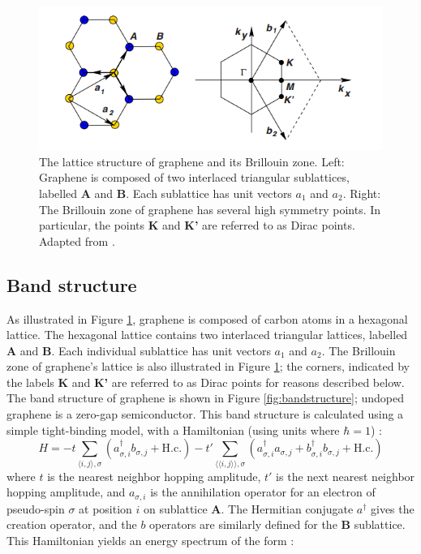 \documentclass[edeposit,fullpage,draftthesis]{uiucthesis2009}
\begin{document}
    \begin{figure}
    \centering
    \includegraphics{images/background/ElecPropertiesFig2.png}
    \caption[The lattice structure of graphene and its Brillouin zone]{The lattice structure of graphene and its Brillouin zone. Left: Graphene is composed of two interlaced triangular sublattices, labelled \textbf{A} and \textbf{B}. Each sublattice has unit vectors $a_1$ and $a_2$. Right: The Brillouin zone of graphene has several high symmetry points. In particular, the points \textbf{K} and \textbf{K'} are referred to as Dirac points. Adapted from \cite{CastroNeto2009}.}
    \label{fig:lattice}
    \end{figure}
		
	\subsection{Band structure}
    As illustrated in Figure \ref{fig:lattice}, graphene is composed of carbon atoms in a hexagonal lattice. The hexagonal lattice contains two interlaced triangular lattices, labelled \textbf{A} and \textbf{B}. Each individual sublattice has unit vectors $a_1$ and $a_2$. The Brillouin zone of graphene's lattice is also illustrated in Figure \ref{fig:lattice}; the corners, indicated by the labels \textbf{K} and \textbf{K'} are referred to as Dirac points for reasons described below. 
    The band structure of graphene is shown in Figure \ref{fig:bandstructure}; undoped graphene is a zero-gap semiconductor. This band structure is calculated using a simple tight-binding model, with a Hamiltonian (using units where $\hbar=1$) \cite{CastroNeto2009}:
    \begin{equation}
    H = - t \sum\limits_{\langle i,j\rangle,\sigma} (a_{\sigma,i}^\dagger b_{\sigma,j} + \text{H.c.})
    - t' \sum\limits_{\langle\langle i,j\rangle\rangle,\sigma} (a_{\sigma,i}^\dagger a_{\sigma,j} + b_{\sigma,i}^\dagger b_{\sigma,j} + \text{H.c.})
    \end{equation}
    where $t$ is the nearest neighbor hopping amplitude, $t'$ is the next nearest neighbor hopping amplitude, and $a_{\sigma,i}$ is the annihilation operator for an electron of pseudo-spin $\sigma$ at position $i$ on sublattice \textbf{A}. The Hermitian conjugate $a^\dagger$ gives the creation operator, and the $b$ operators are similarly defined for the \textbf{B} sublattice. This Hamiltonian yields an energy spectrum of the form \cite{CastroNeto2009}:
\end{document}
